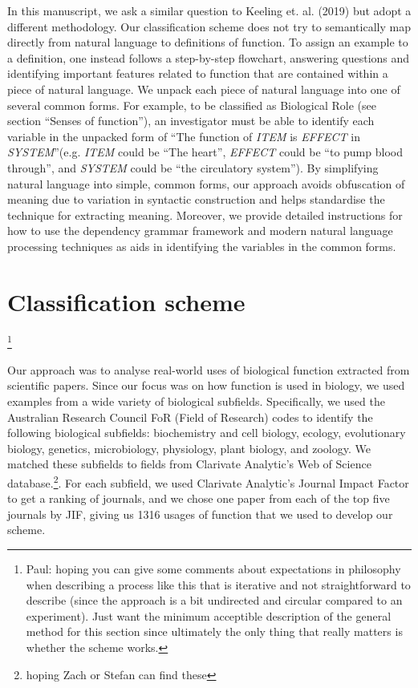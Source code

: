 \documentclass{article}
\begin{document}
In this manuscript, we ask a similar question to Keeling et. al. (2019) but adopt a different methodology.
Our classification scheme does not try to semantically map directly from natural language to definitions of function.
To assign an example to a definition, one instead follows a step-by-step flowchart, answering questions and identifying important features related to function that are contained within a piece of natural language.
We unpack each piece of natural language into one of several common forms.
For example, to be classified as Biological Role (see section ``Senses of function''), an investigator must be able to identify each variable in the unpacked form of ``The function of \emph{ITEM} is \emph{EFFECT} in \emph{SYSTEM}''(e.g. \emph{ITEM} could be ``The heart'', \emph{EFFECT} could be ``to pump blood through'', and \emph{SYSTEM} could be ``the circulatory system'').
By simplifying natural language into simple, common forms, our approach avoids obfuscation of meaning due to variation in syntactic construction and helps standardise the technique for extracting meaning.
Moreover, we provide detailed instructions for how to use the dependency grammar framework and modern natural language processing techniques as aids in identifying the variables in the common forms.

\section{Classification scheme}\footnote{Paul: hoping you can give some comments about expectations in philosophy when describing a process like this that is iterative and not straightforward to describe (since the approach is a bit undirected and circular compared to an experiment). Just want the minimum acceptible description of the general method for this section since ultimately the only thing that really matters is whether the scheme works.}
\label{sec:class-scheme}

Our approach was to analyse real-world uses of biological function extracted from scientific papers.
Since our focus was on how function is used in biology, we used examples from a wide variety of biological subfields.
Specifically, we used the Australian Research Council FoR (Field of Research) codes to identify the following biological subfields: biochemistry and cell biology, ecology, evolutionary biology, genetics, microbiology, physiology, plant biology, and zoology.
We matched these subfields to fields from Clarivate Analytic’s Web of Science database.\footnote{hoping Zach or Stefan can find these}.
For each subfield, we used Clarivate Analytic’s Journal Impact Factor to get a ranking of journals, and we chose one paper from each of the top five journals by JIF, giving us 1316 usages of function that we used to develop our scheme.
\end{document}
